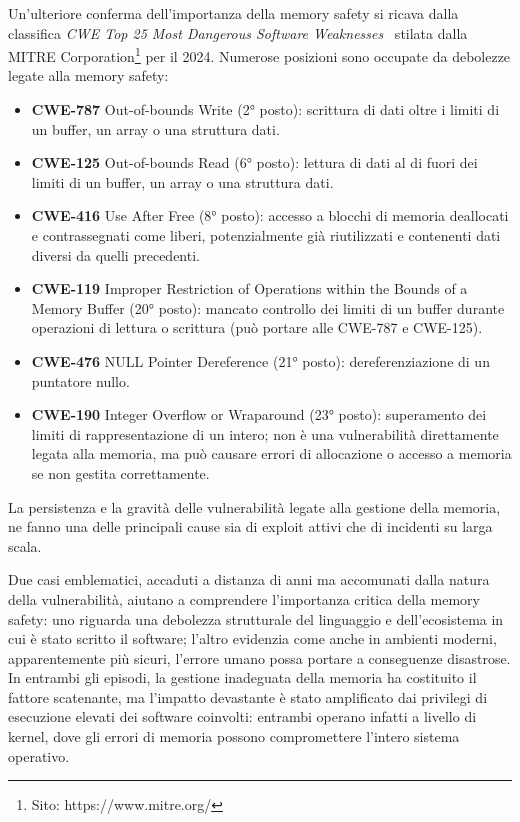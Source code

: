 Un'ulteriore conferma dell'importanza della memory safety si ricava dalla
classifica \textit{CWE Top 25 Most Dangerous Software Weaknesses}~\cite{cwe_top25_2024}
stilata dalla MITRE Corporation\footnote{Sito: https://www.mitre.org/} per il
2024. Numerose posizioni sono occupate da debolezze legate alla memory safety:
\begin{itemize}
  \item \textbf{CWE-787} Out-of-bounds Write (2° posto): scrittura di dati oltre
    i limiti di un buffer, un array o una struttura dati.

  \item \textbf{CWE-125} Out-of-bounds Read (6° posto): lettura di dati al di fuori
    dei limiti di un buffer, un array o una struttura dati.

  \item \textbf{CWE-416} Use After Free (8° posto): accesso a blocchi di memoria
    deallocati e contrassegnati come liberi, potenzialmente già riutilizzati e
    contenenti dati diversi da quelli precedenti.

  \item \textbf{CWE-119} Improper Restriction of Operations within the Bounds of
    a Memory Buffer (20° posto): mancato controllo dei limiti di un buffer durante
    operazioni di lettura o scrittura (può portare alle CWE-787 e CWE-125).

  \item \textbf{CWE-476} NULL Pointer Dereference (21° posto): dereferenziazione
    di un puntatore nullo.

  \item \textbf{CWE-190} Integer Overflow or Wraparound (23° posto): superamento
    dei limiti di rappresentazione di un intero; non è una vulnerabilità
    direttamente legata alla memoria, ma può causare errori di allocazione o accesso
    a memoria se non gestita correttamente.
\end{itemize}
La persistenza e la gravità delle vulnerabilità legate alla gestione della memoria,
ne fanno una delle principali cause sia di exploit attivi che di incidenti su
larga scala.

\bigskip
\noindent
Due casi emblematici, accaduti a distanza di anni ma accomunati dalla natura della
vulnerabilità, aiutano a comprendere l'importanza critica della memory safety: uno
riguarda una debolezza strutturale del linguaggio e dell'ecosistema in cui è stato
scritto il software; l'altro evidenzia come anche in ambienti moderni, apparentemente
più sicuri, l'errore umano possa portare a conseguenze disastrose. In entrambi gli
episodi, la gestione inadeguata della memoria ha costituito il fattore
scatenante, ma l'impatto devastante è stato amplificato dai privilegi di esecuzione
elevati dei software coinvolti: entrambi operano infatti a livello di kernel, dove
gli errori di memoria possono compromettere l'intero sistema operativo.

